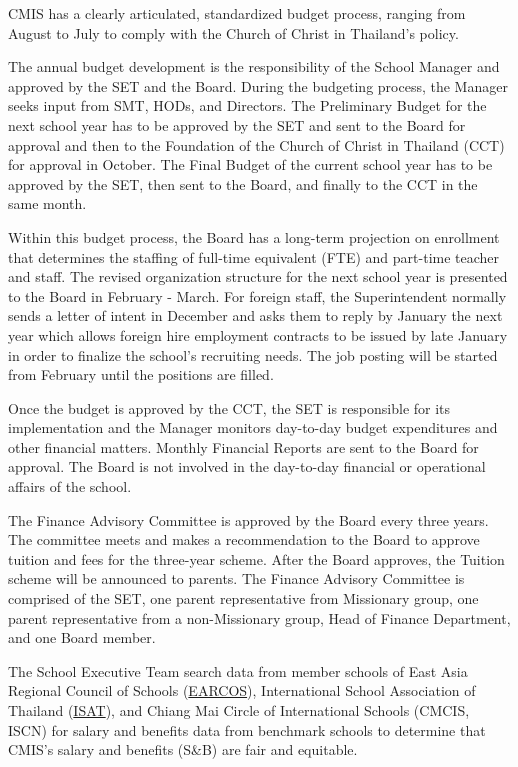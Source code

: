 \begin{findings}
CMIS has a clearly articulated, standardized budget process, ranging from August to July to comply with the Church of Christ in Thailand’s policy. 

 
The annual budget development is the responsibility of the School Manager and approved by the SET and the Board. During the budgeting process, the Manager seeks input from SMT, HODs, and Directors. The Preliminary Budget for the next school year has to be approved by the SET and sent to the Board for approval and then to the Foundation of the Church of Christ in Thailand (CCT) for approval in October. The Final Budget of the current school year has to be approved by the SET, then sent to the Board, and finally to the CCT in the same month.

Within this budget process, the Board has a long-term projection on enrollment that determines the staffing of full-time equivalent (FTE) and part-time teacher and staff. The revised organization structure for the next school year is presented to the Board in February - March. For foreign staff, the Superintendent normally sends a letter of intent in December and asks them to reply by January the next year which allows foreign hire employment contracts to be issued by late January in order to finalize the school’s recruiting needs. The job posting will be started from February until the positions are filled.

Once the budget is approved by the CCT, the SET is responsible for its implementation and the Manager monitors day-to-day budget expenditures and other financial matters. Monthly Financial Reports are sent to the Board for approval. The Board is not involved in the day-to-day financial or operational affairs of the school.

The Finance Advisory Committee is approved by the Board every three years. The committee meets and makes a recommendation to the Board to approve tuition and fees for the three-year scheme. After the Board approves, the Tuition scheme will be announced to parents. The Finance Advisory Committee is comprised of the SET, one parent representative from Missionary group, one parent representative from a non-Missionary group, Head of Finance Department, and one Board member.

The School Executive Team search data from member schools of East Asia Regional Council of Schools (\href{https://www.earcos.org/}{EARCOS}), International School Association of Thailand (\href{https://www.isat.or.th/index.php}{ISAT}), and Chiang Mai Circle of International Schools (CMCIS, ISCN) for salary and benefits data from benchmark schools to determine that CMIS’s salary and benefits (S\&B) are fair and equitable. 


\end{findings}
